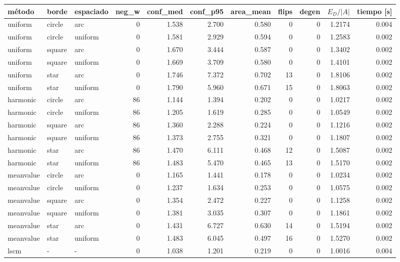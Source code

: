 \begin{tabular}{lllrrrrrrrr}
\toprule
método & borde & espaciado & neg\_w & conf\_med & conf\_p95 & area\_mean & flips & degen & $E_D/|A|$ & tiempo [s] \\
\midrule
uniform & circle & arc & 0 & 1.538 & 2.700 & 0.580 & 0 & 0 & 1.2174 & 0.004 \\
uniform & circle & uniform & 0 & 1.581 & 2.929 & 0.594 & 0 & 0 & 1.2583 & 0.002 \\
uniform & square & arc & 0 & 1.670 & 3.444 & 0.587 & 0 & 0 & 1.3402 & 0.002 \\
uniform & square & uniform & 0 & 1.669 & 3.709 & 0.580 & 0 & 0 & 1.4101 & 0.002 \\
uniform & star & arc & 0 & 1.746 & 7.372 & 0.702 & 13 & 0 & 1.8106 & 0.002 \\
uniform & star & uniform & 0 & 1.790 & 5.960 & 0.671 & 15 & 0 & 1.8063 & 0.002 \\
\midrule
harmonic & circle & arc & 86 & 1.144 & 1.394 & 0.202 & 0 & 0 & 1.0217 & 0.002 \\
harmonic & circle & uniform & 86 & 1.205 & 1.619 & 0.285 & 0 & 0 & 1.0549 & 0.002 \\
harmonic & square & arc & 86 & 1.360 & 2.288 & 0.224 & 0 & 0 & 1.1216 & 0.002 \\
harmonic & square & uniform & 86 & 1.373 & 2.755 & 0.321 & 0 & 0 & 1.1807 & 0.002 \\
harmonic & star & arc & 86 & 1.470 & 6.111 & 0.468 & 12 & 0 & 1.5087 & 0.002 \\
harmonic & star & uniform & 86 & 1.483 & 5.470 & 0.465 & 13 & 0 & 1.5170 & 0.002 \\
\midrule
meanvalue & circle & arc & 0 & 1.165 & 1.441 & 0.178 & 0 & 0 & 1.0234 & 0.002 \\
meanvalue & circle & uniform & 0 & 1.237 & 1.634 & 0.253 & 0 & 0 & 1.0575 & 0.002 \\
meanvalue & square & arc & 0 & 1.354 & 2.472 & 0.227 & 0 & 0 & 1.1258 & 0.002 \\
meanvalue & square & uniform & 0 & 1.381 & 3.035 & 0.307 & 0 & 0 & 1.1861 & 0.002 \\
meanvalue & star & arc & 0 & 1.431 & 6.727 & 0.630 & 14 & 0 & 1.5194 & 0.002 \\
meanvalue & star & uniform & 0 & 1.483 & 6.045 & 0.497 & 16 & 0 & 1.5270 & 0.002 \\
\midrule
lscm & - & - & 0 & 1.038 & 1.201 & 0.219 & 0 & 0 & 1.0016 & 0.004 \\
\bottomrule
\end{tabular}
